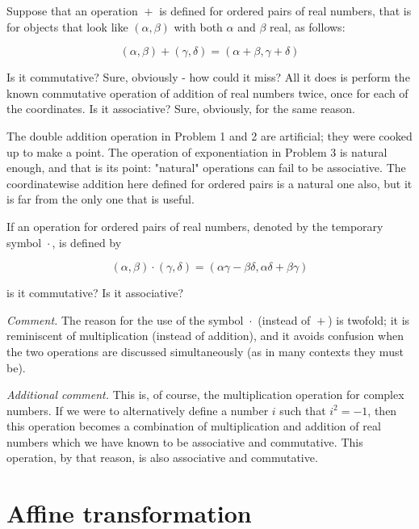 Suppose that an operation $\boxed{+}$ is defined for ordered pairs of real numbers, that is for objects that look like $(\alpha, \beta)$ with both $\alpha$ and $\beta$ real, as follows:

\begin{equation}
    (\alpha, \beta) \boxed{+} (\gamma, \delta) = (\alpha + \beta, \gamma + \delta)
\end{equation}

Is it commutative? Sure, obviously - how could it miss? All it does is perform the known commutative operation of addition of real numbers twice, once for each of the coordinates. Is it associative? Sure, obviously, for the same reason.

The double addition operation in Problem 1 and 2 are artificial; they were cooked up to make a point. The operation of exponentiation in Problem 3 is natural enough, and that is its point: "natural" operations can fail to be associative. The coordinatewise addition here defined for ordered pairs is a natural one also, but it is far from the only one that is useful.

\begin{problem}
If an operation for ordered pairs of real numbers, denoted by the temporary symbol $\boxed{\cdot}$, is defined by

\begin{equation}
    (\alpha, \beta) \boxed{\cdot} (\gamma, \delta) = (\alpha\gamma - \beta\delta, \alpha\delta + \beta\gamma)
\end{equation}

is it commutative? Is it associative?
\end{problem}

\textit{Comment.} The reason for the use of the symbol $\boxed{\cdot}$ (instead of $\boxed{+}$) is twofold; it is reminiscent of multiplication (instead of addition), and it avoids confusion when the two operations are discussed simultaneously (as in many contexts they must be).

\textit{Additional comment.} This is, of course, the multiplication operation for complex numbers. If we were to alternatively define a number $i$ such that $i^2 = -1$, then this operation becomes a combination of multiplication and addition of real numbers which we have known to be associative and commutative. This operation, by that reason, is also associative and commutative.

\section{Affine transformation}


